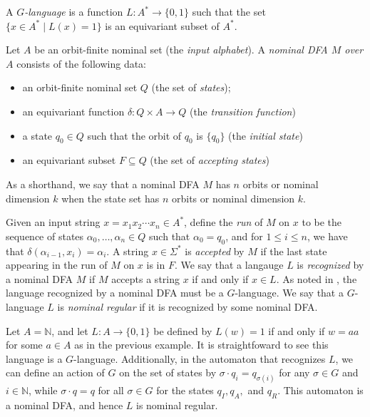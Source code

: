 \documentclass[runningheads]{llncs}
\newcommand{\bb}{\mathbb}
\begin{document}
\begin{definition}[$G$-language]
    A \emph{$G$-language} is a function $L : A^* \to \{0,1\}$ such that the set $\{x \in A^* \mid L(x) = 1\}$ is an equivariant subset of $A^*$. 
\end{definition}

\begin{definition}
    Let $A$ be an orbit-finite nominal set (the \emph{input alphabet}).
    A \emph{nominal DFA $M$ over $A$} consists of the following data:
    \begin{itemize}
        \item an orbit-finite nominal set $Q$ (the set of \emph{states});
        \item an equivariant function $\delta : Q \times A \to Q$ (the \emph{transition function})
        \item a state $q_0 \in Q$ such that the orbit of $q_0$ is $\{q_0\}$ (the \emph{initial state})
        \item an equivariant subset $F \subseteq Q$ (the set of \emph{accepting states})
    \end{itemize}
\end{definition}

As a shorthand, we say that a nominal DFA $M$ has $n$ orbits or nominal dimension $k$ when the state set has $n$ orbits or nominal dimension $k$.

Given an input string $x = x_1 x_2 \cdots x_n \in A^*$, define the \emph{run} of $M$ on $x$ to be the sequence of states $\alpha_0, \ldots, \alpha_n \in Q$ such that $\alpha_0 = q_0$, and for $1 \leq i \leq n$, we have that $\delta(\alpha_{i-1}, x_i) = \alpha_i$. 
A string $x \in \Sigma^*$ is \emph{accepted} by $M$ if the last state appearing in the run of $M$ on $x$ is in $F$.
We say that a langauge $L$ is \emph{recognized} by a nominal DFA $M$ if $M$ accepts a string $x$ if and only if $x \in L$.
As noted in \cite[Definition 3.1]{bojanczyk-klin-lasota:automata-theory-in-nominal-sets}, the language recognized by a nominal DFA must be a $G$-language.
We say that a $G$-language $L$ is \emph{nominal regular} if it is recognized by some nominal DFA.

\begin{example}
    Let $A = \bb N$, and let $L : A \to \{0,1\}$ be defined by $L(w) = 1$ if and only if $w = aa$ for some $a \in A$ as in the previous example. 
    It is straightfoward to see this language is a $G$-language.
    Additionally, in the automaton that recognizes $L$, we can define an action of $G$ on the set of states by $\sigma \cdot q_i = q_{\sigma(i)}$ for any $\sigma \in G$ and $i \in \bb N$, while $\sigma \cdot q = q$ for all $\sigma \in G$ for the states $q_I, q_A,$ and $q_R$. 
    This automaton is a nominal DFA, and hence $L$ is nominal regular.
\end{example}
\end{document}
